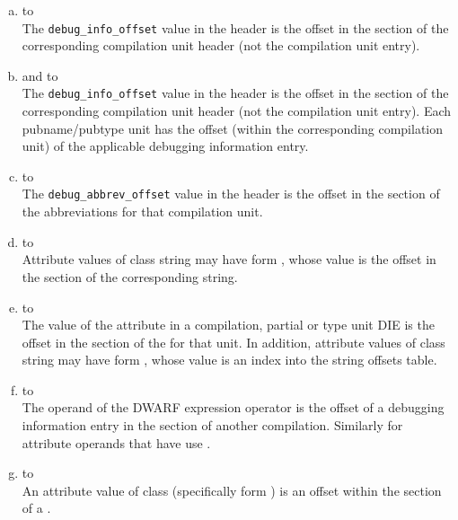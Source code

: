 \begin{enumerate}[(a)]  
\item  \dotdebugaranges{} to \dotdebuginfo \\
The \texttt{debug\_info\_offset} value in
the header is
the offset in the \dotdebuginfo{} section of the
corresponding compilation unit header (not the compilation
unit entry).

\item \dotdebugpubnames{} and \dotdebugpubtypes{} to \dotdebuginfo \\
The \texttt{debug\_info\_offset} value in the header is the offset in the
\dotdebuginfo{} section of the 
corresponding compilation unit header (not
the compilation unit entry). Each pubname/pubtype unit has the offset (within
the corresponding compilation unit) of the applicable debugging
information entry.

\item \dotdebuginfo{} to \dotdebugabbrev \\
The \texttt{debug\_abbrev\_offset} value in the header is the offset in the
\dotdebugabbrev{} 
section of the abbreviations for that compilation unit.

\item  \dotdebuginfo{} to \dotdebugstr \\
Attribute values of class string may have form 
\DWFORMstrp, whose
value is the offset in the \dotdebugstr{}
section of the corresponding string.

\item \dotdebugstroffsets{} to \dotdebugstroffsets \\
The value of the \DWATstroffsetsbase{} attribute in a
compilation, partial or type unit DIE is the offset in the
\dotdebugstroffsets{} section of the 
for that unit.
In addition, attribute values of class string may have form 
\DWFORMstrx, whose value is an index into the
string offsets table.

\item \dotdebuginfo{} to \dotdebuginfo \\
The operand of the \DWOPcallref{} 
DWARF expression operator is the
offset of a debugging information entry in the 
\dotdebuginfo{} section of another compilation.
Similarly for attribute operands that have use
\DWFORMrefaddr.

\item \dotdebuginfo{} to \dotdebugloc \\
An attribute value of class  
(specifically form
\DWFORMsecoffset) 
is an offset within the \dotdebugloc{} 
section of a
.


\end{enumerate}
